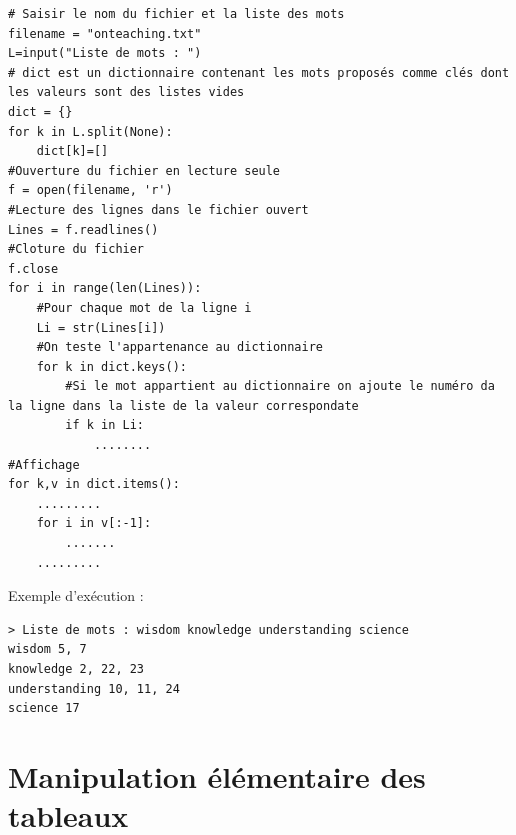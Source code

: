 \documentclass[a4paper]{article}
\begin{document}
\begin{lstlisting}
# Saisir le nom du fichier et la liste des mots
filename = "onteaching.txt" 
L=input("Liste de mots : ")
# dict est un dictionnaire contenant les mots proposés comme clés dont les valeurs sont des listes vides
dict = {}
for k in L.split(None):
    dict[k]=[]
#Ouverture du fichier en lecture seule
f = open(filename, 'r')
#Lecture des lignes dans le fichier ouvert
Lines = f.readlines()
#Cloture du fichier
f.close
for i in range(len(Lines)):
    #Pour chaque mot de la ligne i
    Li = str(Lines[i])
    #On teste l'appartenance au dictionnaire
    for k in dict.keys():
        #Si le mot appartient au dictionnaire on ajoute le numéro da la ligne dans la liste de la valeur correspondate
        if k in Li:
            ........
#Affichage
for k,v in dict.items():
    .........
    for i in v[:-1]:
        .......
    .........
\end{lstlisting}
Exemple d'exécution :
\begin{verbatim}
> Liste de mots : wisdom knowledge understanding science
wisdom 5, 7
knowledge 2, 22, 23
understanding 10, 11, 24
science 17
\end{verbatim}
\section{Manipulation élémentaire des tableaux}
\end{document}
